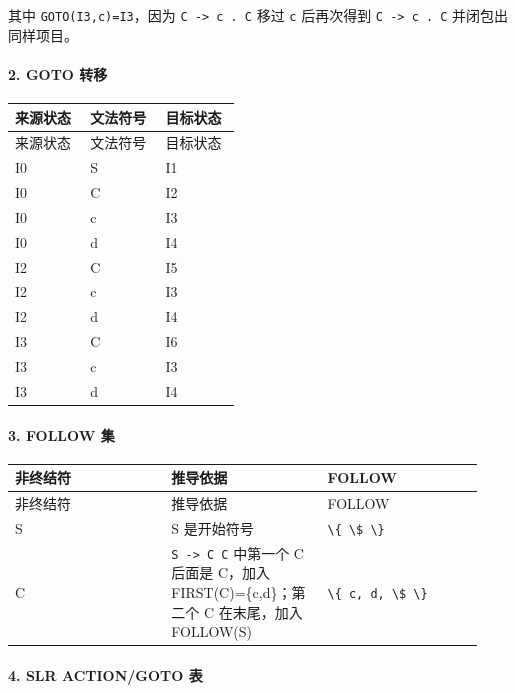 \documentclass[UTF8]{ctexart}
\begin{document}
其中 \texttt{GOTO(I3,c)=I3}，因为 \texttt{C -> c . C} 移过 \texttt{c} 后再次得到 \texttt{C -> c . C} 并闭包出同样项目。

\paragraph*{2. GOTO 转移}

\begin{longtable}{|p{0.31\linewidth}|p{0.31\linewidth}|p{0.31\linewidth}|}
\hline
来源状态 & 文法符号 & 目标状态 \\
\hline
\endfirsthead
来源状态 & 文法符号 & 目标状态 \\
\hline
\endhead
I0 & S & I1 \\
\hline
I0 & C & I2 \\
\hline
I0 & c & I3 \\
\hline
I0 & d & I4 \\
\hline
I2 & C & I5 \\
\hline
I2 & c & I3 \\
\hline
I2 & d & I4 \\
\hline
I3 & C & I6 \\
\hline
I3 & c & I3 \\
\hline
I3 & d & I4 \\
\hline
\end{longtable}

\paragraph*{3. FOLLOW 集}

\begin{longtable}{|p{0.31\linewidth}|p{0.31\linewidth}|p{0.31\linewidth}|}
\hline
非终结符 & 推导依据 & FOLLOW \\
\hline
\endfirsthead
非终结符 & 推导依据 & FOLLOW \\
\hline
\endhead
S & S 是开始符号 & \texttt{\textbackslash{}\{ \textbackslash{}\$ \textbackslash{}\}} \\
\hline
C & \texttt{S -> C C} 中第一个 C 后面是 C，加入 FIRST(C)=\{c,d\}；第二个 C 在末尾，加入 FOLLOW(S) & \texttt{\textbackslash{}\{ c, d, \textbackslash{}\$ \textbackslash{}\}} \\
\hline
\end{longtable}

\paragraph*{4. SLR ACTION/GOTO 表}
\end{document}
